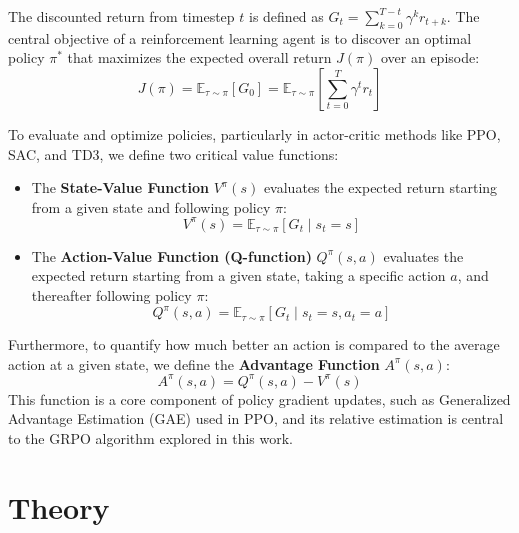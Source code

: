 \documentclass{article}
\begin{document}
The discounted return from timestep $t$ is defined as $G_t = \sum_{k=0}^{T-t} \gamma^k r_{t+k}$. The central objective of a reinforcement learning agent is to discover an optimal policy $\pi^*$ that maximizes the expected overall return $J(\pi)$ over an episode:
\begin{equation}
  J(\pi) = \mathbb{E}_{\tau \sim \pi} [ G_0 ] = \mathbb{E}_{\tau \sim \pi} \left[ \sum_{t=0}^{T} \gamma^t r_t \right]
\end{equation}

To evaluate and optimize policies, particularly in actor-critic methods like PPO, SAC, and TD3, we define two critical value functions:
\begin{itemize}
  \item The \textbf{State-Value Function} $V^\pi(s)$ evaluates the expected return starting from a given state and following policy $\pi$:
    \begin{equation}
      V^\pi(s) = \mathbb{E}_{\tau \sim \pi} \left[ G_t \mid s_t = s \right]
    \end{equation}
  \item The \textbf{Action-Value Function (Q-function)} $Q^\pi(s, a)$ evaluates the expected return starting from a given state, taking a specific action $a$, and thereafter following policy $\pi$:
    \begin{equation}
      Q^\pi(s, a) = \mathbb{E}_{\tau \sim \pi} \left[ G_t \mid s_t = s, a_t = a \right]
    \end{equation}
\end{itemize}

Furthermore, to quantify how much better an action is compared to the average action at a given state, we define the \textbf{Advantage Function} $A^\pi(s, a)$:
\begin{equation}
  A^\pi(s, a) = Q^\pi(s, a) - V^\pi(s)
\end{equation}
This function is a core component of policy gradient updates, such as Generalized Advantage Estimation (GAE) used in PPO, and its relative estimation is central to the GRPO algorithm explored in this work.

\section{Theory}
\end{document}
